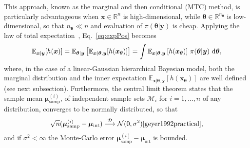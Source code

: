 This approach, known as the marginal and then conditional (MTC) method, is particularly advantageous when $\bm{x}\in \mathbb{R}^n$ is high-dimensional, while $\bm{\theta}\in \mathbb{R}^{n_{\bm{\theta}}}$ is low-dimensional, so that $n_{\bm{\theta}} \ll n$ and evaluation of $\pi(\bm{\theta}| \bm{y})$ is cheap.
Applying the law of total expectation~\cite{champ2022generalizedlawtotalcovariance}, Eq.~\eqref{eq:expPos} becomes
\begin{align}
	\mathbb{E}_{\bm{x} |  \bm{y}} [h(\bm{x})] 
	= \mathbb{E}_{\bm{\theta} |  \bm{y}} \left[ \mathbb{E}_{\bm{x} |  \bm{\theta}, \bm{y}} [h(\bm{x}_{\bm{\theta}})] \right] 
	= \int \mathbb{E}_{\bm{x} |  \bm{\theta}, \bm{y}} \left[ h(\bm{x}_{\bm{\theta}}) \right] \, \pi(\bm{\theta} |  \bm{y}) \, \mathop{}\!\mathrm{d} \bm{\theta},
	\label{eq:fullCond}
\end{align}
where, in the case of a linear-Gaussian hierarchical Bayesian model, both the marginal distribution and the inner expectation $\mathbb{E}_{\bm{x} |  \bm{\theta}, \bm{y}} \left[ h(\bm{x}_{\bm{\theta}}) \right]$ are well defined (see next subsection).
Furthermore, the central limit theorem states that the sample mean $ \bm{\mu}^{(i)}_{\text{samp}} $, of independent sample sets $\mathcal{M}_i$ for $i = 1, \dots, n$ of any distribution, converges to be normally distributed, so that
\begin{align}
	\sqrt{n} (\bm{\mu}^{(i)}_{\text{samp}} -  \bm{\mu}_{\text{int}} ) \overset{\mathcal{D}}{\longrightarrow} \mathcal{N} (0,\sigma^2) \text{\cite{geyer1992practical}},
\end{align}
and if $\sigma^2 < \infty$ the Monte-Carlo error $\bm{\mu}^{(i)}_{\text{samp}} -  \bm{\mu}_{\text{int}} $ is bounded.

